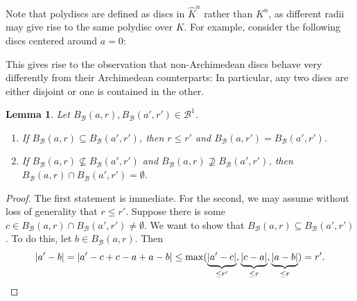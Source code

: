 \documentclass[10pt]{article}
\newtheorem{lemma}[theorem]{Lemma}
\theoremstyle{definition}
\newcommand{\ZZ}{\mathbb{Z}}
\newcommand{\QQ}{\mathbb{Q}}
\begin{document}
Note that polydiscs are defined as discs in $\hat K^n$ rather than $K^n$, as different radii may give rise to the same polydisc over $K$. For example, consider the following discs centered around $a=0$:
    \begin{center}
    \end{center}

This gives rise to the observation that non-Archimedean discs behave very differently from their Archimedean counterparts: In particular, any two discs are either disjoint or one is contained in the other.

\begin{lemma}
  \label{lem:recentre}
  Let $B_{\mathcal{B}}(a,r), B_{\mathcal{B}}(a',r')\in \mathcal B^1$.
  \begin{enumerate}
  \item[(i)] If $B_{\mathcal{B}}(a,r) \subseteq B_{\mathcal{B}}(a',r')$, then $r\leq r'$ and $B_{\mathcal{B}}(a,r')=B_{\mathcal{B}}(a',r')$.
  \item[(ii)] If $B_{\mathcal{B}}(a,r) \nsubseteq B_{\mathcal{B}}(a',r')$ and $B_{\mathcal{B}}(a,r) \nsupseteq B_{\mathcal{B}}(a',r')$, then $B_{\mathcal{B}}(a,r)\cap B_{\mathcal{B}}(a',r')=\emptyset$.
  \end{enumerate}
\end{lemma}
\begin{proof}
The first statement is immediate.  For the second, we may assume without loss of generality that $r\leq r'$.  Suppose there is some $c\in B_{\mathcal{B}}(a,r)\cap B_{\mathcal{B}}(a',r')\neq\emptyset$.  We want to show that $B_{\mathcal{B}}(a,r)\subseteq B_{\mathcal{B}}(a',r')$.  To do this, let $b\in B_{\mathcal{B}}(a,r)$.  Then
  \begin{equation*}
    |a'-b| = |a'-c+c-a+a-b| \leq \max(\underbrace{|a'-c|}_{\leq r'},\underbrace{|c-a|}_{\leq r},\underbrace{|a-b|}_{\leq r}) = r'. \qedhere
  \end{equation*}
\end{proof}
\end{document}
